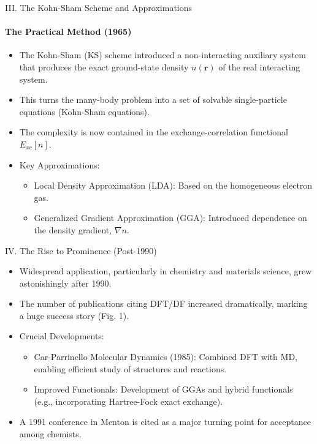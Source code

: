 \begin{frame}{\large III. The Kohn-Sham Scheme and Approximations}
    \framesubtitle{The Practical Method (1965)}
    \begin{itemize}
        \item The Kohn-Sham (KS) scheme introduced a non-interacting auxiliary system that produces the exact ground-state density $n(\mathbf{r})$ of the real interacting system.
        \item This turns the many-body problem into a set of solvable single-particle equations (Kohn-Sham equations).
        \item The complexity is now contained in the exchange-correlation functional $E_{xc}[n]$.
        \item Key Approximations:
        \begin{itemize}
            \item Local Density Approximation (LDA): Based on the homogeneous electron gas.
            \item Generalized Gradient Approximation (GGA): Introduced dependence on the density gradient, $\nabla n$.
        \end{itemize}
    \end{itemize}
\end{frame}

\begin{frame}{\large IV. The Rise to Prominence (Post-1990)}
    \begin{itemize}
        \item Widespread application, particularly in chemistry and materials science, grew astonishingly after 1990.
        \item The number of publications citing DFT/DF increased dramatically, marking a huge success story (Fig. 1).
        \item Crucial Developments:
        \begin{itemize}
            \item Car-Parrinello Molecular Dynamics (1985): Combined DFT with MD, enabling efficient study of structures and reactions.
            \item Improved Functionals: Development of GGAs and hybrid functionals (e.g., incorporating Hartree-Fock exact exchange).
        \end{itemize}
        \item A 1991 conference in Menton is cited as a major turning point for acceptance among chemists.
    \end{itemize}
\end{frame}

